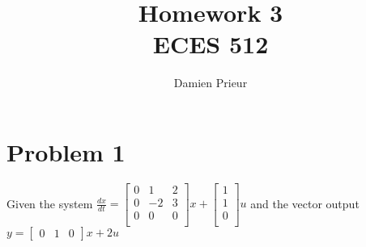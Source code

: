 \documentclass{article}
\author{Damien Prieur}
\title{Homework 3 \\ ECES 512}
\date{}
\begin{document}
\maketitle

\section*{Problem 1}
Given the system
$\frac{dx}{dt} =
\begin{bmatrix}
0 &  1 & 2 \\
0 & -2 & 3 \\
0 &  0 & 0 \\
\end{bmatrix}
x +
\begin{bmatrix}
1 \\
1 \\
0 \\
\end{bmatrix}
u
$
and the vector output $ y = \begin{bmatrix} 0 & 1 & 0 \end{bmatrix}x + 2 u $
\end{document}
